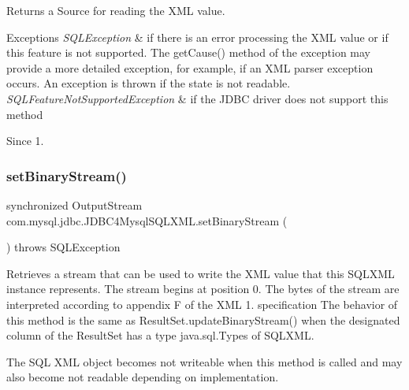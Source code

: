 \begin{DoxyReturn}{Returns}
a Source for reading the X\+ML value. 
\end{DoxyReturn}

\begin{DoxyExceptions}{Exceptions}
{\em S\+Q\+L\+Exception} & if there is an error processing the X\+ML value or if this feature is not supported. The get\+Cause() method of the exception may provide a more detailed exception, for example, if an X\+ML parser exception occurs. An exception is thrown if the state is not readable. \\
\hline
{\em S\+Q\+L\+Feature\+Not\+Supported\+Exception} & if the J\+D\+BC driver does not support this method \\
\hline
\end{DoxyExceptions}
\begin{DoxySince}{Since}
1. 
\end{DoxySince}
\mbox{\label{classcom_1_1mysql_1_1jdbc_1_1_j_d_b_c4_mysql_s_q_l_x_m_l_a048031448277a2530b56d1f29116e81c}} 
\subsubsection{\texorpdfstring{set\+Binary\+Stream()}{setBinaryStream()}}
{\footnotesize\ttfamily synchronized Output\+Stream com.\+mysql.\+jdbc.\+J\+D\+B\+C4\+Mysql\+S\+Q\+L\+X\+M\+L.\+set\+Binary\+Stream (\begin{DoxyParamCaption}{ }\end{DoxyParamCaption}) throws S\+Q\+L\+Exception}

Retrieves a stream that can be used to write the X\+ML value that this S\+Q\+L\+X\+ML instance represents. The stream begins at position 0. The bytes of the stream are interpreted according to appendix F of the X\+ML 1. specification The behavior of this method is the same as Result\+Set.\+update\+Binary\+Stream() when the designated column of the Result\+Set has a type java.\+sql.\+Types of S\+Q\+L\+X\+ML. 

The S\+QL X\+ML object becomes not writeable when this method is called and may also become not readable depending on implementation.

